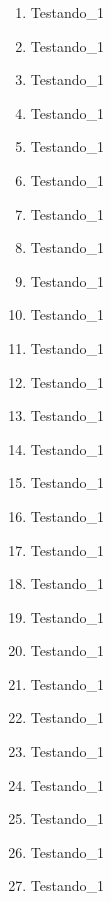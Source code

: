 \documentclass[a4paper,landscape]{article}
\begin{document}
\begin{enumerate}
\item Testando_1
\item Testando_1
\item Testando_1
\item Testando_1
\item Testando_1
\item Testando_1
\item Testando_1
\item Testando_1
\item Testando_1
\item Testando_1
\item Testando_1
\item Testando_1
\item Testando_1
\item Testando_1
\item Testando_1
\item Testando_1
\item Testando_1
\item Testando_1
\item Testando_1
\item Testando_1
\item Testando_1
\item Testando_1
\item Testando_1
\item Testando_1
\item Testando_1
\item Testando_1
\item Testando_1
\end{enumerate}
\end{document}
